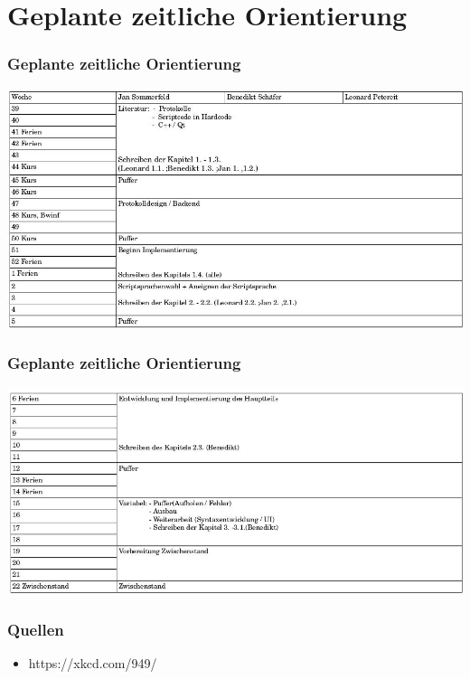 \documentclass[newPxFont,numfooter,sectionpages]{beamer}
\begin{document}
\section{Geplante zeitliche Orientierung}
\begin{frame}
\frametitle{Geplante zeitliche Orientierung}
\includegraphics[scale=0.31]{z}
\end{frame}
\begin{frame}
\frametitle{Geplante zeitliche Orientierung}
\includegraphics[scale=0.31]{z1}
\end{frame}

\begin{frame}
\frametitle{Quellen}
\begin{itemize}
\item{https://xkcd.com/949/}
\end{itemize}

\end{frame}
\end{document}
